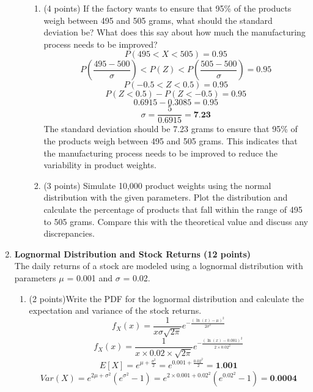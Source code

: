 \documentclass[a3paper,12pt]{article} %
\begin{document}
\begin{enumerate}
\begin{enumerate}
\begin{enumerate}
            \item (4 points) If the factory wants to ensure that 95\% of the products weigh between 495 and 505
            grams, what should the standard deviation be? What does this say about how much the manufacturing
            process needs to be improved?
            \[
                P(495 < X < 505) = 0.95
            \]
            \[
                P\left(\frac{495 - 500}{\sigma}\right) < P(Z) < P\left(\frac{505 - 500}{\sigma}\right) = 0.95
            \]
            \[
                P(-0.5 < Z < 0.5) = 0.95
            \]
            \[
                P(Z < 0.5) - P(Z < -0.5) = 0.95
            \]
            \[
                0.6915 - 0.3085 = 0.95
            \]
            \[
                \sigma = \frac{5}{0.6915} = \textbf{7.23}
            \]
            The standard deviation should be 7.23 grams to ensure that 95\% of the products weigh between 495 and 505 grams. This indicates that the manufacturing process needs to be improved to reduce the variability in product weights.
            \item (3 points) Simulate 10,000 product weights using the normal distribution with the given parameters.
            Plot the distribution and calculate the percentage of products that fall within the range of
            495 to 505 grams. Compare this with the theoretical value and discuss any discrepancies.
        \end{enumerate}
    \end{enumerate}
    \newpage
    \item \textbf{Lognormal Distribution and Stock Returns (12 points)}
    \\ The daily returns of a stock are modeled using a lognormal distribution with parameters \(\mu\) = 0.001
    and \(\sigma \) = 0.02.
    \begin{enumerate}
        \item (2 points)Write the PDF for the lognormal distribution and calculate the expectation and variance
        of the stock returns.
        \[
            f_X(x) = \frac{1}{x\sigma\sqrt{2\pi}} e^{-\frac{(\ln(x) - \mu)^2}{2\sigma^2}}
        \]
        \[
            f_X(x) = \frac{1}{x \times 0.02 \times \sqrt{2\pi}} e^{-\frac{(\ln(x) - 0.001)^2}{2 \times 0.02^2}}
        \]
        \[
            E[X] = e^{\mu + \frac{\sigma^2}{2}} = e^{0.001 + \frac{0.02^2}{2}} = \textbf{1.001}
        \]
        \[
            Var(X) = e^{2\mu + \sigma^2}(e^{\sigma^2} - 1) = e^{2 \times 0.001 + 0.02^2}(e^{0.02^2} - 1) = \textbf{0.0004}
        \]

\end{enumerate}
\end{enumerate}
\end{document}
